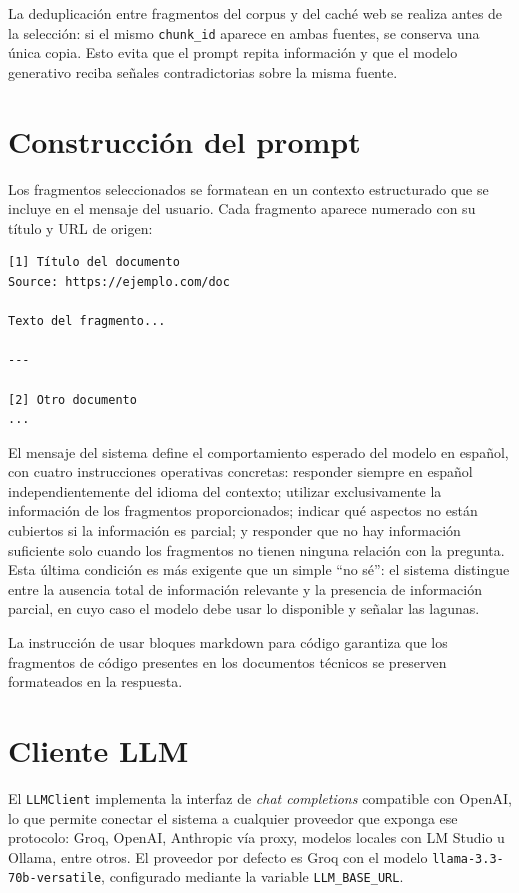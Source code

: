 \documentclass[11pt]{article}
\begin{document}
La deduplicación entre fragmentos del corpus y del caché web se realiza antes de la selección:
si el mismo \texttt{chunk\_id} aparece en ambas fuentes, se conserva una única copia. Esto
evita que el prompt repita información y que el modelo generativo reciba señales contradictorias
sobre la misma fuente.

\section{Construcción del prompt}

Los fragmentos seleccionados se formatean en un contexto estructurado que se incluye en el
mensaje del usuario. Cada fragmento aparece numerado con su título y URL de origen:

\begin{verbatim}
[1] Título del documento
Source: https://ejemplo.com/doc

Texto del fragmento...

---

[2] Otro documento
...
\end{verbatim}

El mensaje del sistema define el comportamiento esperado del modelo en español, con cuatro
instrucciones operativas concretas: responder siempre en español independientemente del idioma
del contexto; utilizar exclusivamente la información de los fragmentos proporcionados; indicar
qué aspectos no están cubiertos si la información es parcial; y responder que no hay
información suficiente solo cuando los fragmentos no tienen ninguna relación con la pregunta.
Esta última condición es más exigente que un simple ``no sé'': el sistema distingue entre la
ausencia total de información relevante y la presencia de información parcial, en cuyo caso
el modelo debe usar lo disponible y señalar las lagunas.

La instrucción de usar bloques markdown para código garantiza que los fragmentos de código
presentes en los documentos técnicos se preserven formateados en la respuesta.

\section{Cliente LLM}

El \texttt{LLMClient} implementa la interfaz de \emph{chat completions} compatible con
OpenAI, lo que permite conectar el sistema a cualquier proveedor que exponga ese protocolo:
Groq, OpenAI, Anthropic vía proxy, modelos locales con LM Studio u Ollama, entre otros. El
proveedor por defecto es Groq con el modelo \texttt{llama-3.3-70b-versatile}, configurado
mediante la variable \texttt{LLM\_BASE\_URL}.
\end{document}
